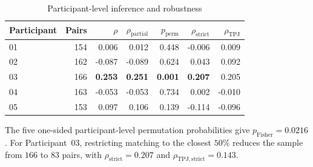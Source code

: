 \documentclass[graybox,natbib]{SNmult}
\providecommand{\1}{}
\renewcommand{\1}{\mathbbm 1}
\begin{document}
\begin{table}[htbp]
\centering
\caption{Participant-level inference and robustness}
\label{tab:appendix-participant-results}
\small
\begin{tabular}{lrrrrrr}
\toprule
Participant &
Pairs &
\(\rho\) &
\(\rho_{\mathrm{partial}}\) &
\(p_{\mathrm{perm}}\) &
\(\rho_{\mathrm{strict}}\) &
\(\rho_{\mathrm{TPJ}}\) \\
\midrule
01 & 154 &  0.006 &  0.012 & 0.448 & -0.006 &  0.009 \\
02 & 162 & -0.087 & -0.089 & 0.624 &  0.043 &  0.092 \\
03 & 166 &  \textbf{0.253} & \textbf{0.251} &
\textbf{0.001} & \textbf{0.207} & 0.205 \\
04 & 163 & -0.053 & -0.053 & 0.734 &  0.002 & -0.010 \\
05 & 153 &  0.097 &  0.106 & 0.139 & -0.114 & -0.096 \\
\bottomrule
\end{tabular}
\end{table}

The five one-sided participant-level permutation probabilities give
\(p_{\mathrm{Fisher}}=0.0216\). For Participant~03, restricting matching to
the closest \(50\%\) reduces the sample from \(166\) to \(83\) pairs, with
\(\rho_{\mathrm{strict}}=0.207\) and
\(\rho_{\mathrm{TPJ,strict}}=0.143\).








\end{document}
